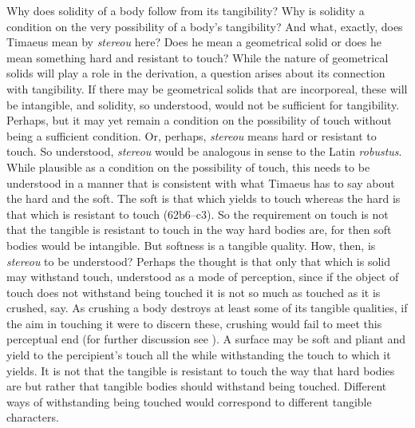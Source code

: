 Why does solidity of a body follow from its tangibility? Why is solidity a condition on the very possibility of a body's tangibility? And what, exactly, does Timaeus mean by \emph{stereou} here? Does he mean a geometrical solid or does he mean something hard and resistant to touch? While the nature of geometrical solids will play a role in the derivation, a question arises about its connection with tangibility. If there may be geometrical solids that are incorporeal, these will be intangible, and solidity, so understood, would not be sufficient for tangibility. Perhaps, but it may yet remain a condition on the possibility of touch without being a sufficient condition. Or, perhaps, \emph{stereou} means hard or resistant to touch. So understood, \emph{stereou} would be analogous in sense to the Latin \emph{robustus}. While plausible as a condition on the possibility of touch, this needs to be understood in a manner that is consistent with what Timaeus has to say about the hard and the soft. The soft is that which yields to touch whereas the hard is that which is resistant to touch (62b6–c3). So the requirement on touch is not that the tangible is resistant to touch in the way hard bodies are, for then soft bodies would be intangible. But softness is a tangible quality. How, then, is \emph{stereou} to be understood? Perhaps the thought is that only that which is solid may withstand touch, understood as a mode of perception, since if the object of touch does not withstand being touched it is not so much as touched as it is crushed, say. As crushing a body destroys at least some of its tangible qualities, if the aim in touching it were to discern these, crushing would fail to meet this perceptual end (for further discussion see \citealt[59--60]{Kalderon:2018oe}). A surface may be soft and pliant and yield to the percipient's touch all the while withstanding the touch to which it yields. It is not that the tangible is resistant to touch the way that hard bodies are but rather that tangible bodies should withstand being touched. Different ways of withstanding being touched would correspond to different tangible characters.

